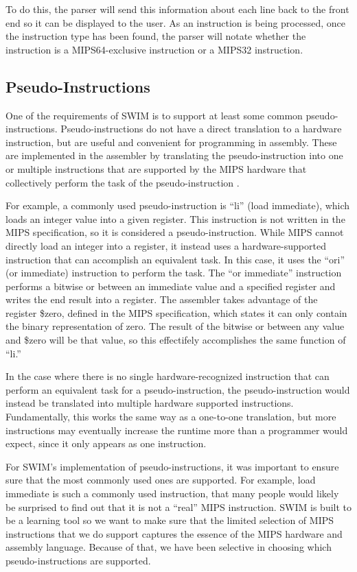 \documentclass[
    paper=letter,
    parskip=half,
    fontsize=12pt,
    titlepage=firstiscover,
    toc=bibliography,
    numbers=endperiod
]{scrartcl}
\begin{document}
To do this, the parser will send this information about each line back
to the front end so it can be displayed to the user. As an instruction
is being processed, once the instruction type has been found, the parser
will notate whether the instruction is a MIPS64-exclusive instruction or
a MIPS32 instruction.

\subsection{Pseudo-Instructions}

One of the requirements of SWIM is to support at least some common
pseudo-instructions. Pseudo-instructions do not have a direct
translation to a hardware instruction, but are useful and convenient for
programming in assembly. These are implemented in the assembler by
translating the pseudo-instruction into one or multiple instructions
that are supported by the MIPS hardware that collectively perform the
task of the pseudo-instruction \cite{koehn-pseudoinstructions}.

For example, a commonly used pseudo-instruction is ``li'' (load
immediate), which loads an integer value into a given register. This
instruction is not written in the MIPS specification, so it is
considered a pseudo-instruction. While MIPS cannot directly load an
integer into a register, it instead uses a hardware-supported
instruction that can accomplish an equivalent task. In this case, it
uses the ``ori'' (or immediate) instruction to perform the task. The
``or immediate'' instruction performs a bitwise or between an immediate
value and a specified register and writes the end result into a
register. The assembler takes advantage of the register \$zero, defined
in the MIPS specification, which states it can only contain the binary
representation of zero. The result of the bitwise or between any value
and \$zero will be that value, so this effectifely accomplishes the same
function of ``li.''

In the case where there is no single hardware-recognized instruction
that can perform an equivalent task for a pseudo-instruction, the
pseudo-instruction would instead be translated into multiple hardware
supported instructions. Fundamentally, this works the same way as a
one-to-one translation, but more instructions may eventually increase
the runtime more than a programmer would expect, since it only appears
as one instruction.

For SWIM's implementation of pseudo-instructions, it was important to
ensure sure that the most commonly used ones are supported. For example,
load immediate is such a commonly used instruction, that many people
would likely be surprised to find out that it is not a ``real'' MIPS
instruction. SWIM is built to be a learning tool so we want to make sure
that the limited selection of MIPS instructions that we do support
captures the essence of the MIPS hardware and assembly language. Because
of that, we have been selective in choosing which pseudo-instructions
are supported.
\end{document}
